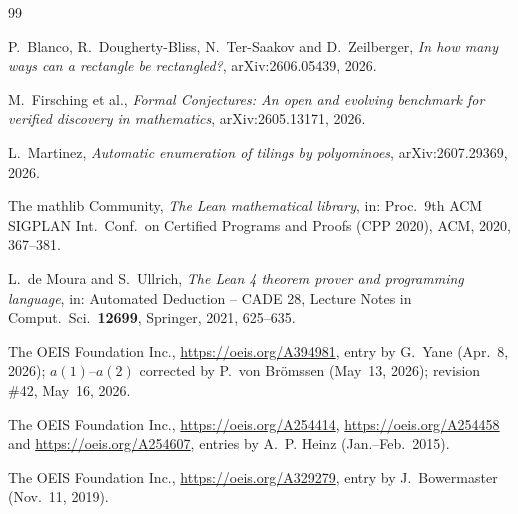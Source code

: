 \documentclass[11pt]{amsart}
\theoremstyle{plain}
\theoremstyle{definition}
\begin{document}
{\footnotesize
\begin{thebibliography}{99}

P.~Blanco, R.~Dougherty-Bliss, N.~Ter-Saakov and D.~Zeilberger, \emph{In how many ways can a rectangle be rectangled?}, arXiv:2606.05439, 2026.

M.~Firsching et al., \emph{Formal Conjectures: An open and evolving benchmark for verified discovery in mathematics}, arXiv:2605.13171, 2026.

L.~Martinez, \emph{Automatic enumeration of tilings by polyominoes}, arXiv:2607.29369, 2026.

The mathlib Community, \emph{The Lean mathematical library}, in: Proc.\ 9th ACM SIGPLAN Int.\ Conf.\ on Certified Programs and Proofs (CPP 2020), ACM, 2020, 367--381.

L.~de Moura and S.~Ullrich, \emph{The Lean 4 theorem prover and programming language}, in: Automated Deduction -- CADE 28, Lecture Notes in Comput.\ Sci.\ \textbf{12699}, Springer, 2021, 625--635.

The OEIS Foundation Inc., \url{https://oeis.org/A394981}, entry by G.~Yane (Apr.~8, 2026); $a(1)$--$a(2)$ corrected by P.~von Brömssen (May~13, 2026); revision \#42, May~16, 2026.

The OEIS Foundation Inc., \url{https://oeis.org/A254414}, \url{https://oeis.org/A254458} and \url{https://oeis.org/A254607}, entries by A.~P. Heinz (Jan.--Feb.\ 2015).

The OEIS Foundation Inc., \url{https://oeis.org/A329279}, entry by J.~Bowermaster (Nov.~11, 2019).

\end{thebibliography}
}
\end{document}
